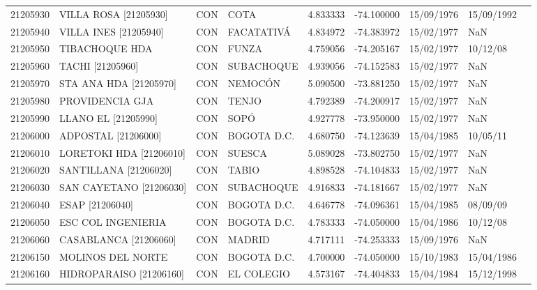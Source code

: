 \begin{landscape}
\begin{longtable}{lp{4cm}lp{3cm}lrrll}
   21205930 &       VILLA ROSA [21205930] &  CON &              COTA &  4.833333 & -74.100000 &  15/09/1976 &  15/09/1992 \\
   21205940 &       VILLA INES [21205940] &  CON &        FACATATIVÁ &  4.834972 & -74.383972 &  15/02/1977 &         NaN \\
   21205950 &              TIBACHOQUE HDA &  CON &             FUNZA &  4.759056 & -74.205167 &  15/02/1977 &    10/12/08 \\
   21205960 &            TACHI [21205960] &  CON &        SUBACHOQUE &  4.939056 & -74.152583 &  15/02/1977 &         NaN \\
   21205970 &      STA ANA HDA [21205970] &  CON &           NEMOCÓN &  5.090500 & -73.881250 &  15/02/1977 &         NaN \\
   21205980 &             PROVIDENCIA GJA &  CON &             TENJO &  4.792389 & -74.200917 &  15/02/1977 &         NaN \\
   21205990 &         LLANO EL [21205990] &  CON &              SOPÓ &  4.927778 & -73.950000 &  15/02/1977 &         NaN \\
   21206000 &         ADPOSTAL [21206000] &  CON &       BOGOTA D.C. &  4.680750 & -74.123639 &  15/04/1985 &    10/05/11 \\
   21206010 &     LORETOKI HDA [21206010] &  CON &            SUESCA &  5.089028 & -73.802750 &  15/02/1977 &         NaN \\
   21206020 &    SANTILLANA    [21206020] &  CON &             TABIO &  4.898528 & -74.104833 &  15/02/1977 &         NaN \\
   21206030 &     SAN CAYETANO [21206030] &  CON &        SUBACHOQUE &  4.916833 & -74.181667 &  15/02/1977 &         NaN \\
   21206040 &             ESAP [21206040] &  CON &       BOGOTA D.C. &  4.646778 & -74.096361 &  15/04/1985 &    08/09/09 \\
   21206050 &          ESC COL INGENIERIA &  CON &       BOGOTA D.C. &  4.783333 & -74.050000 &  15/04/1986 &    10/12/08 \\
   21206060 &       CASABLANCA [21206060] &  CON &            MADRID &  4.717111 & -74.253333 &  15/09/1976 &         NaN \\
   21206150 &           MOLINOS DEL NORTE &  CON &       BOGOTA D.C. &  4.700000 & -74.050000 &  15/10/1983 &  15/04/1986 \\
   21206160 &     HIDROPARAISO [21206160] &  CON &        EL COLEGIO &  4.573167 & -74.404833 &  15/04/1984 &  15/12/1998 \\

\end{longtable}
\end{landscape}
